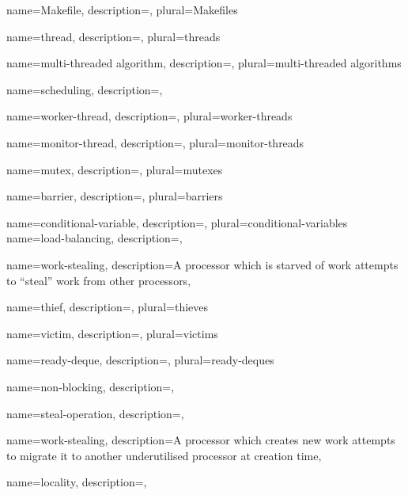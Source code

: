 {
    name={Makefile},
    description={},
    plural={Makefiles}
}

{
    name={thread},
    description={},
    plural={threads}
}

{
    name={multi-threaded algorithm},
    description={},
    plural={multi-threaded algorithms}
}

{
    name={scheduling},
    description={},    
}

{
    name={worker-thread},
    description={},
    plural={worker-threads}
}

{
    name={monitor-thread},
    description={},
    plural={monitor-threads}
}

{
    name={mutex},
    description={},
    plural={mutexes}
}

{
    name={barrier},
    description={},
    plural={barriers}
}

{
    name={conditional-variable},
    description={},
    plural={conditional-variables}
}
{
    name={load-balancing},
    description={},
}

{
    name={work-stealing},
    description={A processor which is starved of work attempts to ``steal'' 
                 work from other processors},
}

{
    name={thief},
    description={},
    plural={thieves}
}

{
    name={victim},
    description={},
    plural={victims}
}

{
    name={ready-deque},
    description={},
    plural={ready-deques}
}

{
    name={non-blocking},
    description={},
}

{
    name={steal-operation},
    description={},
}

{
    name={work-stealing},
    description={A processor which creates new work attempts to migrate it to 
                 another underutilised processor at creation time},
}

{
    name={locality},
    description={},
}

